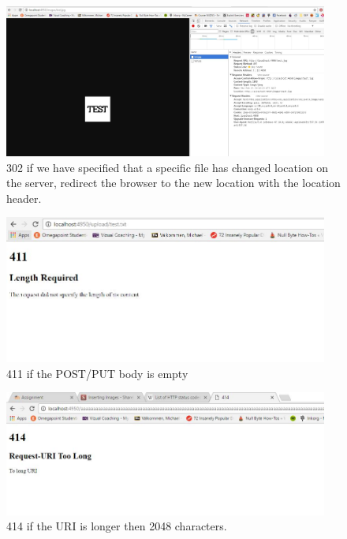 \documentclass[a4paper,12pt]{article}
\numberwithin{figure}{section}
\begin{document}
\begin{figure}[h!]
	\centering
	\label{302}
	\includegraphics[width=0.95\textwidth,keepaspectratio]{img/302.jpg} 
	\caption{302 if we have specified that a specific file has changed location on the server, redirect the browser to the new location with the location header.}
\end{figure}

\begin{figure}[h!]
	\centering
	\label{411}
	\includegraphics[width=0.95\textwidth,keepaspectratio]{img/411.jpg} 
	\caption{411 if the POST/PUT body is empty}
\end{figure}

\begin{figure}[h!]
	\centering
	\label{414}
	\includegraphics[width=0.95\textwidth,keepaspectratio]{img/414.jpg} 
	\caption{414 if the URI is longer then 2048 characters.}
\end{figure}
\end{document}
